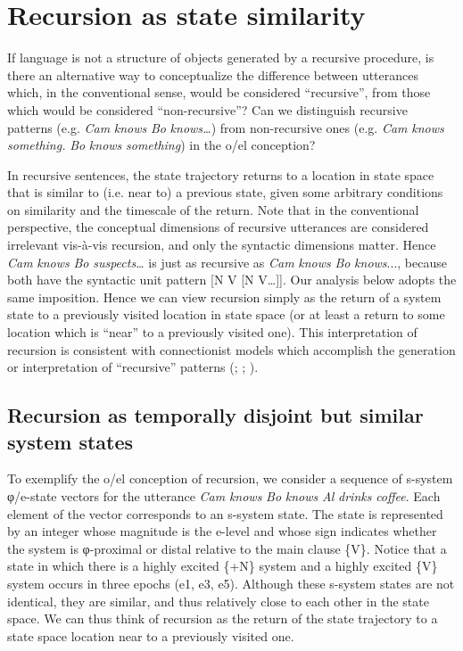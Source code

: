 \section{Recursion as state similarity}

If language is not a structure of objects generated by a recursive procedure, is there an alternative way to conceptualize the difference between utterances which, in the conventional sense, would be considered “recursive”, from those which would be considered “non-recursive”? Can we distinguish recursive patterns (e.g. \textit{Cam} \textit{knows} \textit{Bo} \textit{knows…}) from non-recursive ones (e.g. \textit{Cam} \textit{knows} \textit{something.} \textit{Bo} \textit{knows} \textit{something}) in the o/el conception? 

  In recursive sentences, the state trajectory returns to a location in state space that is similar to (i.e. near to) a previous state, given some arbitrary conditions on similarity and the timescale of the return. Note that in the conventional perspective, the conceptual dimensions of recursive utterances are considered irrelevant vis-à-vis recursion, and only the syntactic dimensions matter. Hence \textit{Cam} \textit{knows} \textit{Bo} \textit{suspects…} is just as recursive as \textit{Cam} \textit{knows} \textit{Bo} \textit{knows}..., because both have the syntactic unit pattern [N V [N V…]]. Our analysis below adopts the same imposition. Hence we can view recursion simply as the return of a system state to a previously visited location in state space (or at least a return to some location which is “near” to a previously visited one). This interpretation of recursion is consistent with connectionist models which accomplish the generation or interpretation of “recursive” patterns (\citealt{ChristiansenChater1999}; \citealt{Elman1989}; \citealt{Smolensky1990}).

\subsection{Recursion as temporally disjoint but similar system states}

To exemplify the o/el conception of recursion, we consider a sequence of s-system φ/e-state vectors for the utterance \textit{Cam} \textit{knows} \textit{Bo} \textit{knows} \textit{Al} \textit{drinks} \textit{coffee}. Each element of the vector corresponds to an s-system state. The state is represented by an integer whose magnitude is the e-level and whose sign indicates whether the system is φ-proximal or distal relative to the main clause \{V\}. Notice that a state in which there is a highly excited \{+N\} system and a highly excited \{V\} system occurs in three epochs (e1, e3, e5). Although these s-system states are not identical, they are similar, and thus relatively close to each other in the state space. We can thus think of recursion as the return of the state trajectory to a state space location near to a previously visited one.

